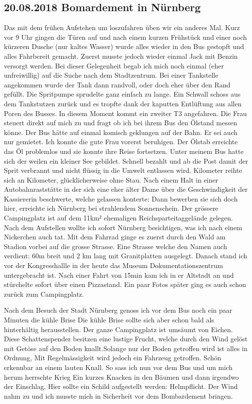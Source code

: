 \subsection{20.08.2018 Bomardement in Nürnberg}
Das mit dem frühen Aufstehen um loszufahren üben wir ein anderes Mal.
Kurz vor 9 Uhr gingen die Türen auf und nach einem kurzen Frühstück und einer noch kürzeren Dusche (nur kaltes Wasser) wurde alles wieder in den Bus gestopft und alles Fahrbereit gemacht.
Zuerst musste jedoch wieder einmal Jack mit Benzin versorgt werden.
Bei dieser Gelegenheit begab ich mich noch einmal (eher unfreiwillig) auf die Suche nach dem Stadtzentrum.
Bei einer Tankstelle angekommen wurde der Tank dann randvoll, oder doch eher über den Rand gefüllt.
Die Spritpumpe sprudelte ganz einfach zu lange.
Ein Schwall schoss aus dem Tankstutzen zurück und es tropfte dank der kaputten Entlüftung aus allen Poren des Busses.
In diesem Moment kommt ein zweiter T3 angefahren.
Die Frau steuert direkt auf mich zu und fragt ob ich bei ihrem Bus den Ölstand messen könne.
Der Bus hätte auf einmal komisch geklungen auf der Bahn.
Er sei auch nur gemietet.
Ich konnte die gute Frau vorerst beruhigen.
Der Ölstab erreichte das Öl problemlos und sie konnte ihre Reise fortsetzen.
Unter meinem Bus hatte sich der weilen ein kleiner See gebildet.
Schnell bezahlt und ab die Post damit der Sprit verbrannt und nicht flüssig in die Umwelt entlassen wird.
Kilometer reihte sich an Kilometer, glücklicherweise ohne Stau.
Nach einem Halt in einer Autobahnraststätte in der sich eine eher älter Dame über die Geschwindigkeit der Kassiererin beschwerte, welche gelassen konterte: Dann bewerben sie sich doch hier, erreichte ich Nürnberg bei strahlendem Sonnenschein.
Der grössere Campingplatz ist auf dem 11km$²$ ehemaligen Reichsparteitaggelände gelegen.
Nach dem Aufstellen wollte ich sofort Nürnberg besichtigen, was ich nach einem Nickerchen auch tat.
Mit dem Fahrrad ginge es zuerst durch  den Wald am Stadion vorbei auf die grosse Strasse.
Eine Strasse welche den Namen auch verdient: 60m breit und 2 km lang mit Granitplatten ausgelegt.
Danach stand ich vor der Kongresshallle in der heute das Museum \qlqq Dokumentationszentrum\qrqq{} untergebracht ist. 
Nach einer Fahrt von 15min kam ich in er Altstadt an und stürchelte sofort über einen Pizzastand.
Ein paar Fotos später ging es auch schon zurück zum Campingplatz.

Nach dem Besuch der Stadt Nürnberg genoss ich vor dem Bus noch ein paar Minuten die kühle Brise
Die kühle Brise sollte sich aber schon bald als hinterhältig herausstellen.
Der ganze Campingplatz ist umsäumt von Eichen.
Diese Schattenspender besitzen eine lustige Frucht, welche durch den Wind gelöst mit Getöse auf den Boden knallt.Solange nur der Boden getroffen wird ist alles in Ordnung,
Mit Regelmässigkeit wird jedoch ein Fahrzeug getroffen.
Schön erkennbar an einem lauten Knall.
So sass ich nun vor dem Bus und um mich herum herrschte Krieg
Ein kurzes Knacken in den Bäumen und dann irgendwo der Einschlag.
Hier sollte ein Schild aufgestellt werden: Helmpflicht.
Der Wind nahm zu und ich musste mich in Sicherheit vor dem Bombardement bringen.

